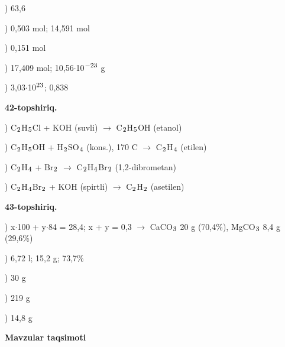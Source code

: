 \documentclass[11pt,a4paper]{article}
\renewcommand{\textsubscript}[1]{\ensuremath{_{\text{\fontsize{8}{8}\selectfont #1}}}}
\renewcommand{\textsuperscript}[1]{\ensuremath{^{\text{\fontsize{8}{8}\selectfont #1}}}}
\begin{document}
) 63,6\par
{}) 0,503 mol; 14,591 mol\par
{}) 0,151 mol\par
{}) 17,409 mol; 10,56$\cdot$10\textsuperscript{$-$23} g\par
{}) 3,03$\cdot$10\textsuperscript{23}; 0,838\par
\noindent\textbf{42-topshiriq.}\par
{}) C\textsubscript{2}H\textsubscript{5}Cl + KOH (suvli) $\to$ C\textsubscript{2}H\textsubscript{5}OH (etanol)\par
{}) C\textsubscript{2}H\textsubscript{5}OH + H\textsubscript{2}SO\textsubscript{4} (kons.), 170 \textdegree{}C $\to$ C\textsubscript{2}H\textsubscript{4} (etilen)\par
{}) C\textsubscript{2}H\textsubscript{4} + Br\textsubscript{2} $\to$ C\textsubscript{2}H\textsubscript{4}Br\textsubscript{2} (1,2-dibrometan)\par
{}) C\textsubscript{2}H\textsubscript{4}Br\textsubscript{2} + KOH (spirtli) $\to$ C\textsubscript{2}H\textsubscript{2} (asetilen)\par
\noindent\textbf{43-topshiriq.}\par
{}) x$\cdot$100 + y$\cdot$84 = 28,4; x + y = 0,3 $\to$ CaCO\textsubscript{3} 20 g (70,4\%), MgCO\textsubscript{3} 8,4 g (29,6\%)\par
{}) 6,72 l; 15,2 g; 73,7\%\par
{}) 30 g\par
{}) 219 g\par
{}) 14,8 g\par
\par\bigskip\noindent\textbf{Mavzular taqsimoti}\par\smallskip
\end{document}
